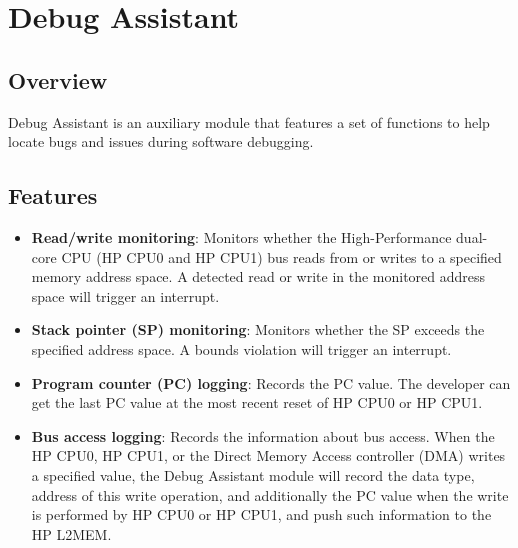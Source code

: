 \documentclass[main\_\_EN.tex]{subfiles}
\begin{document}

\ifglobal
\else
    {\let\clearpage\relax \listoftodos}
    {\let\clearpage\relax \listofdonetodos}
    \tableofcontents
\fi



\chapter{Debug Assistant}
\label{mod:dbgassist}
\hypertarget{dbgassist}{}

\section{Overview}

Debug Assistant is an auxiliary module that features a set of functions to help locate bugs and issues during software debugging.

\section{Features}
\label{sec:dbgassist-features}

\begin{itemize}
    \item {\bfseries Read/write monitoring}: Monitors whether the High-Performance dual-core CPU (HP CPU0 and HP CPU1) bus reads from or writes to a specified memory address space. A detected read or write in the monitored address space will trigger an interrupt.
    \item {\bfseries Stack pointer (SP) monitoring}: Monitors whether the SP exceeds the specified address space. A bounds violation will trigger an interrupt.
    \item {\bfseries Program counter (PC) logging}: Records the PC value. The developer can get the last PC value at the most recent reset of HP CPU0 or HP CPU1.
    \item{\bfseries Bus access logging}: Records the information about bus access. When the HP CPU0, HP CPU1, or the Direct Memory Access controller (DMA) writes a specified value, the Debug Assistant module will record the data type, address of this write operation, and additionally the PC value when the write is performed by HP CPU0 or HP CPU1, and push such information to the HP L2MEM.
\end{itemize}
\end{document}
